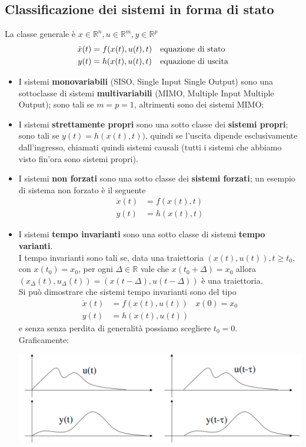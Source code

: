 \documentclass{article}
\begin{document}
\subsection{Classificazione dei sistemi in forma di stato}
La classe generale è  $x \in \mathbb{R}^n , u \in \mathbb{R}^m , y\in \mathbb{R}^p$
\begin{align*}
    \dot x(t) &= f (x(t), u(t), t) & &\text{equazione di stato}\\
    y(t) &= h(x(t), u(t), t) & &\text{equazione di uscita}  
\end{align*}
\begin{itemize}
    \item I sistemi \textbf{monovariabili} (SISO, Single Input Single Output) sono una sottoclasse di sistemi \textbf{multivariabili} (MIMO, Multiple Input Multiple Output); sono tali se $m=p=1$, altrimenti sono dei sistemi MIMO;
    \item I sistemi \textbf{strettamente propri} sono una sotto classe dei \textbf{sistemi propri}; sono tali se $y(t) = h(x(t),t))$, quindi se l'uscita dipende esclusivamente dall'ingresso, chiamati quindi sistemi causali (tutti i sistemi che abbiamo visto fin'ora sono sistemi propri).
    \item I sistemi \textbf{non forzati} sono una sotto classe dei \textbf{sistemi forzati}; un esempio di sistema non forzato è il seguente
    \begin{align*}
        \dot x(t) &= f(x(t),t)\\
        y(t) &= h(x(t),t)
    \end{align*}
    \item I sistemi \textbf{tempo invarianti} sono una sotto classe di sistemi \textbf{tempo  varianti}.\\
    I tempo invarianti sono tali se, data una traiettoria $ (x(t), u(t)), t\geq t_0$, con $x(t_0)=x_0$, per ogni $\Delta \in \mathbb{R}$ vale che $x(t_0+\Delta)=x_0$ allora $(x_{\Delta} (t), u_{\Delta} (t)) = (x(t-\Delta), u(t-\Delta))$ è una traiettoria.\\
    Si può dimostrare che sistemi tempo invarianti sono del tipo
    \begin{align*}
        \dot x(t) &= f (x(t), u(t)) &x(0)=x_0\\
        y(t) &= h(x(t), u(t))
    \end{align*}
    e senza senza perdita di generalità possiamo scegliere $t_0=0$.\\
    Graficamente:
    \begin{center}
        \includegraphics[scale=0.3]{Images/Sistemi_tempo_invarianti.png}

\end{center}
\end{itemize}
\end{document}
